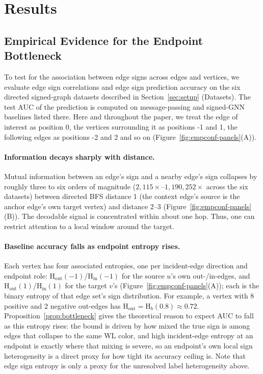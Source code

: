 \documentclass[sigconf]{acmart}
\newcommand{\Hh}{\mathrm{H}}
\newcommand{\indeg}{\mathrm{in}}
\newcommand{\outdeg}{\mathrm{out}}
\theoremstyle{plain}
\theoremstyle{definition}
\begin{document}
\section{Results}

\subsection{Empirical Evidence for the Endpoint Bottleneck}
\label{sec:empconf}
To test for the association between edge signs across edges and vertices,  we evaluate edge sign correlations and edge sign prediction accuracy on the six directed signed-graph datasets described in Section~\ref{sec:setup} (Datasets). The test AUC of the prediction is computed on message-passing and signed-GNN baselines listed there. Here and throughout the paper, we treat the edge of interest as position 0, the vertices surrounding it as positions -1 and 1, the following edges as positions -2 and 2 and so on (Figure~\ref{fig:empconf-panels}(A)).

\paragraph{Information decays sharply with distance.}
Mutual information between an edge's sign and a nearby edge's sign collapses by roughly three to six orders of magnitude ($2{,}115\times$--$1{,}190{,}252\times$ across the six datasets) between directed BFS distance 1 (the context edge's source is the anchor edge's own target vertex) and distance 2--3 (Figure~\ref{fig:empconf-panels}(B)). The decodable signal is concentrated within about one hop. Thus, one can restrict attention to a local window around the target.

\paragraph{Baseline accuracy falls as endpoint entropy rises.}
Each vertex has four associated entropies, one per incident-edge direction and endpoint role: $\Hh_\outdeg(-1)$/$\Hh_\indeg(-1)$ for the source $u$'s own out-/in-edges, and $\Hh_\outdeg(1)$/$\Hh_\indeg(1)$ for the target $v$'s (Figure~\ref{fig:empconf-panels}(A)); each is the binary entropy of that edge set's sign distribution. For example, a vertex with 8 positive and 2 negative out-edges has $\Hh_\outdeg=\Hh_b(0.8)\approx0.72$. Proposition~\ref{prop:bottleneck} gives the theoretical reason to expect AUC to fall as this entropy rises: the bound is driven by how mixed the true sign is among edges that collapse to the same WL color, and high incident-edge entropy at an endpoint is exactly where that mixing is severe, so an endpoint's own local sign heterogeneity is a direct proxy for how tight its accuracy ceiling is. Note that edge sign entropy is only a proxy for the unresolved label heterogeneity above.
\end{document}
